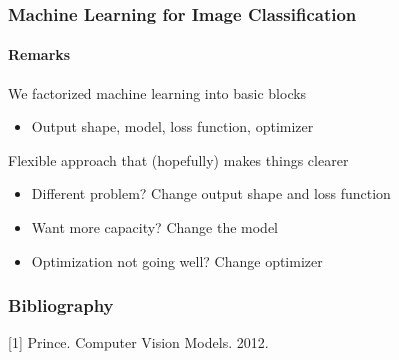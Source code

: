 \documentclass[xetex,professionalfont]{beamer}
\let\oldemph\emph
\renewcommand\emph[1]{\textcolor{tuwcvl_cvl_blue}{#1}}
\begin{document}
\begin{frame}
  \frametitle{Machine Learning for Image Classification}
  \framesubtitle{Remarks}

We factorized machine learning into basic blocks
\begin{itemize}
    \item Output shape, model, loss function, optimizer
\end{itemize}

\bigskip

Flexible approach that (hopefully) makes things clearer
\begin{itemize}
    \item Different problem? Change output shape and loss function
    \item Want more capacity? Change the model
    \item Optimization not going well? Change optimizer
\end{itemize}

\end{frame}


\renewcommand\emph[1]{\oldemph{#1}}

\begin{frame}
\frametitle{Bibliography}

[1] Prince. Computer Vision Models. 2012.

\end{frame}
\end{document}
